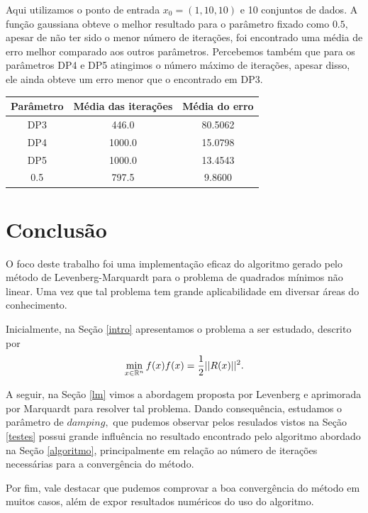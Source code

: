 \documentclass[12pt,a4paper]{article}
\newcounter{ex}[section]
\begin{document}
	
	Aqui utilizamos o ponto de entrada $x_0 = (1, 10, 10)$ e 10 conjuntos de dados. A função gaussiana obteve o melhor resultado para o parâmetro fixado como $0.5,$ apesar de não ter sido o menor número de iterações, foi encontrado uma média de erro melhor comparado aos outros parâmetros. Percebemos também que para os parâmetros DP4 e DP5 atingimos o número máximo de iterações, apesar disso, ele ainda obteve um erro menor que o encontrado em DP3.
	
	\begin{table}[H]
		\centering
		\begin{tabular}{|c|c|c|}
			\hline
			Parâmetro & Média das iterações & Média do erro\\
			\hline
			
			DP3 & 446.0 & 80.5062\\ \hline
			DP4 & 1000.0 & 15.0798\\ \hline
			DP5 & 1000.0 & 13.4543\\ \hline
			0.5 & 797.5 & 9.8600\\		\hline	
			
		\end{tabular}
	\end{table}

	
	\section{Conclusão}
	
	O foco deste trabalho foi uma implementação eficaz do algoritmo gerado pelo método de Levenberg-Marquardt para o problema de quadrados mínimos não linear. Uma vez que tal problema tem grande aplicabilidade em diversar áreas do conhecimento. 
	
	Inicialmente, na Seção \ref{intro} apresentamos o problema a ser estudado, descrito por 
	\begin{equation*}
	\min_{x \in \mathbb{R}^{n}} f(x) 
	\\	
	f(x) = \frac{1}{2}||R(x)||^2.
	\end{equation*}
	
	A seguir, na Seção \ref{lm} vimos a abordagem proposta por Levenberg e aprimorada por Marquardt para resolver tal problema. Dando consequência, estudamos o parâmetro de $damping,$ que pudemos observar pelos resulados vistos na Seção \ref{testes} possui grande influência no resultado encontrado pelo algoritmo abordado na Seção \ref{algoritmo}, principalmente em relação ao número de iterações necessárias para a convergência do método.
	
	Por fim, vale destacar que pudemos comprovar a boa convergência do método em muitos casos, além de expor resultados numéricos do uso do algoritmo.
	
	
	\nocite{aes}
	\nocite{friedlander1994elementos}
	\nocite{kab}
	
	
	
\end{document}
